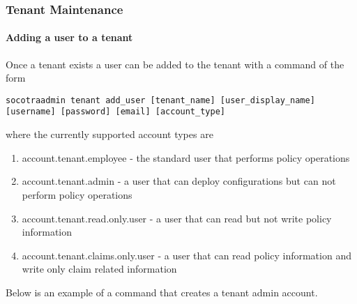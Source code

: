 \begin{Shaded}
\begin{Highlighting}[]
 
\end{Highlighting}
\end{Shaded}

\hypertarget{tenant-maintenance}{%
\subsubsection{Tenant Maintenance}\label{tenant-maintenance}}

\hypertarget{adding-a-user-to-a-tenant}{%
\paragraph{Adding a user to a tenant}\label{adding-a-user-to-a-tenant}}

Once a tenant exists a user can be added to the tenant with a command of
the form

\begin{verbatim}
socotraadmin tenant add_user [tenant_name] [user_display_name] [username] [password] [email] [account_type]
\end{verbatim}

where the currently supported account types are

\begin{enumerate}
\def\labelenumi{\arabic{enumi}.}
\tightlist
\item
  account.tenant.employee - the standard user that performs policy
  operations
\item
  account.tenant.admin - a user that can deploy configurations but can
  not perform policy operations
\item
  account.tenant.read.only.user - a user that can read but not write
  policy information
\item
  account.tenant.claims.only.user - a user that can read policy
  information and write only claim related information
\end{enumerate}

Below is an example of a command that creates a tenant admin account.

